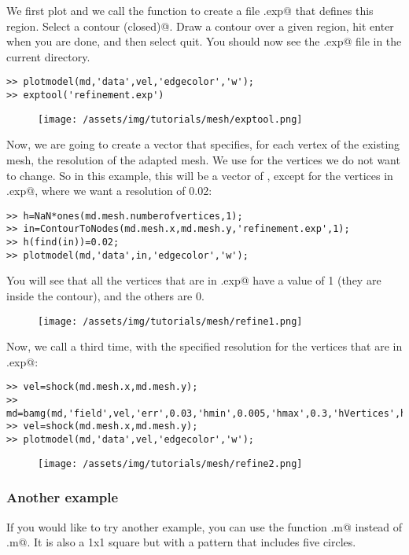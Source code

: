 We first plot \verb@vel@ and we call the function \verb@exptool@ to create a file \verb@refinement.exp@ that defines this region. Select \verb@add a contour (closed)@. Draw a contour over a given region, hit enter when you are done, and then select quit. You should now see the \verb@refinement.exp@ file in the current directory.
\begin{verbatim}>> plotmodel(md,'data',vel,'edgecolor','w');
>> exptool('refinement.exp')
\end{verbatim}
\begin{figure}[H]
	\begin{center}
		\texttt{[image: /assets/img/tutorials/mesh/exptool.png]}
	\end{center}
\end{figure}

Now, we are going to create a vector that specifies, for each vertex of the existing mesh, the resolution of the adapted mesh. We use \verb@NaN@ for the vertices we do not want to change. So in this example, this will be a vector of \verb@NaN@, except for the vertices in \verb@refinement.exp@, where we want a resolution of 0.02:
\begin{verbatim}>> h=NaN*ones(md.mesh.numberofvertices,1);
>> in=ContourToNodes(md.mesh.x,md.mesh.y,'refinement.exp',1);
>> h(find(in))=0.02;
>> plotmodel(md,'data',in,'edgecolor','w');
\end{verbatim}
You will see that all the vertices that are in \verb@refinement.exp@ have a value of 1 (they are inside the contour), and the others are 0.
\begin{figure}[H]
	\begin{center}
		\texttt{[image: /assets/img/tutorials/mesh/refine1.png]}
	\end{center}
\end{figure}

Now, we call \verb@bamg@ a third time, with the specified resolution for the vertices that are in \verb@refinement.exp@:
\begin{verbatim}>> vel=shock(md.mesh.x,md.mesh.y);
>> md=bamg(md,'field',vel,'err',0.03,'hmin',0.005,'hmax',0.3,'hVertices',h);
>> vel=shock(md.mesh.x,md.mesh.y);
>> plotmodel(md,'data',vel,'edgecolor','w');
\end{verbatim}
\begin{figure}[H]
	\begin{center}
		\texttt{[image: /assets/img/tutorials/mesh/refine2.png]}
	\end{center}
\end{figure}
\subsubsection{Another example}%
If you would like to try another example, you can use the function \verb@circles.m@ instead of
\verb@shock.m@. It is also a 1x1 square but with a pattern that includes five circles.
